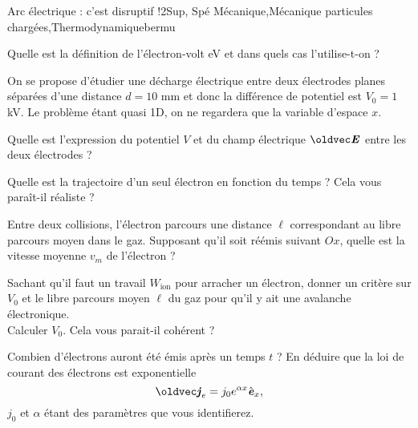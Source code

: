 
\begin{exercise}{Arc électrique : c'est disruptif !}{2}{Sup, Spé}
{Mécanique,Mécanique particules chargées,Thermodynamique}{bermu}

\begin{questions}
\questioncours Quelle est la définition de l'électron-volt eV et dans quels cas l'utilise-t-on ?

\begin{EnvUplevel}
On se propose d'étudier une décharge électrique entre deux électrodes planes séparées d'une distance $d = 10$ mm et donc la différence de potentiel est $V_0 = 1$ kV. Le problème étant quasi 1D, on ne regardera que la variable d'espace $x$.
\end{EnvUplevel}

\question Quelle est l'expression du potentiel $V$ et du champ électrique $\vE$ entre les deux électrodes ?

\question Quelle est la trajectoire d'un seul électron en fonction du temps ? Cela vous paraît-il réaliste ?


\question Entre deux collisions, l'électron parcours une distance $\ell$ correspondant au libre parcours moyen dans le gaz. Supposant qu'il soit réémis suivant $Ox$, quelle est la vitesse moyenne $v_m$ de l'électron ?


\question Sachant qu'il faut un travail $W_\text{ion}$ pour arracher un électron, donner un critère sur $V_0$ et le libre parcours moyen $\ell$ du gaz pour qu'il y ait une avalanche électronique. \\
Calculer $V_0$. Cela vous parait-il cohérent ?

\question Combien d'électrons auront été émis après un temps $t$ ? En déduire que la loi de courant des électrons est exponentielle
$$\vj_e = j_0 e^{\alpha x}\ve_x,$$
$j_0$ et $\alpha$ étant des paramètres que vous identifierez.



\end{questions}
\end{exercise}

